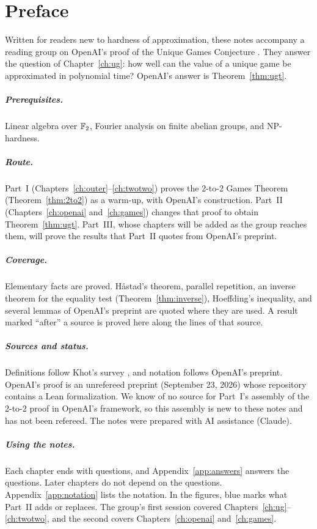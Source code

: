 \chapter*{Preface}

Written for readers new to hardness of approximation, these notes accompany a reading group on OpenAI's proof of the Unique Games Conjecture \cite{OAI}. They answer the question of Chapter~\ref{ch:ug}: how well can the value of a unique game be approximated in polynomial time? OpenAI's answer is Theorem~\ref{thm:ugt}.

\paragraph{Prerequisites.} Linear algebra over $\mathbb{F}_2$, Fourier analysis on finite abelian groups, and NP-hardness.

\paragraph{Route.} Part~I (Chapters~\ref{ch:outer}--\ref{ch:twotwo}) proves the 2-to-2 Games Theorem (Theorem~\ref{thm:2to2}) as a warm-up, with OpenAI's construction. Part~II (Chapters~\ref{ch:openai} and~\ref{ch:games}) changes that proof to obtain Theorem~\ref{thm:ugt}. Part~III, whose chapters will be added as the group reaches them, will prove the results that Part~II quotes from OpenAI's preprint.

\paragraph{Coverage.} Elementary facts are proved. H\aa stad's theorem, parallel repetition, an inverse theorem for the equality test (Theorem~\ref{thm:inverse}), Hoeffding's inequality, and several lemmas of OpenAI's preprint are quoted where they are used. A result marked ``after'' a source is proved here along the lines of that source.

\paragraph{Sources and status.} Definitions follow Khot's survey \cite{Khot10}, and notation follows OpenAI's preprint. OpenAI's proof is an unrefereed preprint (September 23, 2026) whose repository contains a Lean formalization. We know of no source for Part~I's assembly of the 2-to-2 proof in OpenAI's framework, so this assembly is new to these notes and has not been refereed. The notes were prepared with AI assistance (Claude).

\paragraph{Using the notes.} Each chapter ends with questions, and Appendix~\ref{app:answers} answers the questions. Later chapters do not depend on the questions. Appendix~\ref{app:notation} lists the notation. In the figures, blue marks what Part~II adds or replaces. The group's first session covered Chapters~\ref{ch:ug}--\ref{ch:twotwo}, and the second covers Chapters~\ref{ch:openai} and~\ref{ch:games}.
